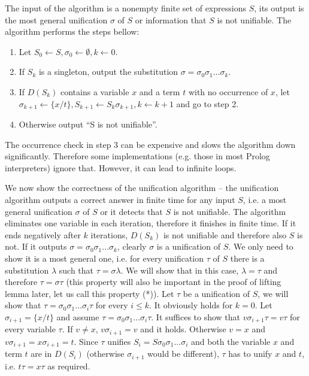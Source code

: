 The input of the algorithm is a nonempty finite set of expressions $S$, its output is the most general unification $\sigma$ of $S$ or information that $S$ is not unifiable. The algorithm performs the steps bellow:
\begin{enumerate}
	\item Let $S_0 \gets S, \sigma_0 \gets \emptyset, k \gets 0$.
	\item If $S_k$ is a singleton, output the substitution $\sigma = \sigma_0 \sigma_1 \dots \sigma_k$.
	\item If $D(S_k)$ contains a variable $x$ and a term $t$ with no occurrence of $x$, let $\sigma_{k+1} \gets \{x/t\}, S_{k+1} \gets S_k \sigma_{k+1}, k \gets k+1$ and go to step 2.
	\item Otherwise output ``S is not unifiable''.
\end{enumerate}

The occurrence check in step 3 can be expensive and slows the algorithm down significantly. Therefore some implementations (e.g. those in most Prolog interpreters) ignore that. However, it can lead to infinite loops.

We now show the correctness of the unification algorithm -- the unification algorithm outputs a correct answer in finite time for any input $S$, i.e. a most general unification $\sigma$ of $S$ or it detects that $S$ is not unifiable. The algorithm eliminates one variable in each iteration, therefore it finishes in finite time. If it ends negatively after $k$ iterations, $D(S_k)$ is not unifiable and therefore also $S$ is not. If it outputs $\sigma = \sigma_0 \sigma_1 \dots \sigma_k$, clearly $\sigma$ is a unification of $S$. We only need to show it is a most general one, i.e. for every unification $\tau$ of $S$ there is a substitution $\lambda$ such that $\tau = \sigma \lambda$. We will show that in this case, $\lambda = \tau$ and therefore $\tau = \sigma \tau$ (this property will also be important in the proof of lifting lemma later, let us call this property (*)). Let $\tau$ be a unification of $S$, we will show that $\tau = \sigma_0 \sigma_1 \dots \sigma_i \tau$ for every $i \leq k$. It obviously holds for $k = 0$. Let $\sigma_{i+1} = \{x/t\}$ and assume $\tau = \sigma_0 \sigma_1 \dots \sigma_i \tau$. It suffices to show that $v \sigma_{i+1} \tau = v \tau$ for every variable $\tau$. If $v \neq x$, $v \sigma_{i+1} = v$ and it holds. Otherwise $v = x$ and $v \sigma_{i+1} = x \sigma_{i+1} = t$. Since $\tau$ unifies $S_i=S \sigma_0 \sigma_1 \dots \sigma_i$ and both the variable $x$ and term $t$ are in $D(S_i)$ (otherwise $\sigma_{i+1}$ would be different), $\tau$ has to unify $x$ and $t$, i.e. $t \tau = x \tau$ as required.

